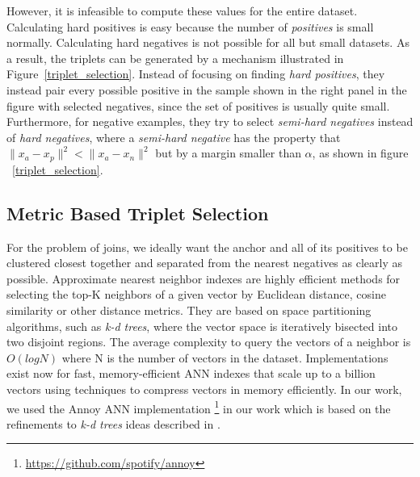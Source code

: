 However, it is infeasible to compute these values for the entire dataset.  Calculating hard positives is easy because the number of \textit{positives} is small normally.  Calculating hard negatives is not possible for all but small datasets.  As a result, the triplets can be generated by a mechanism illustrated in Figure~\ref{triplet_selection}.  Instead of focusing on finding \textit{hard positives}, they instead pair every possible positive in the sample shown in the right panel in the figure with selected negatives, since the set of positives is usually quite small.  Furthermore, for negative examples, they try to select \textit{semi-hard negatives} instead of \textit{hard negatives}, where a \textit{semi-hard negative} has the property that $\|x_a - x_p \|^2 < \|x_a - x_n \|^2$ but by a margin smaller than $\alpha$, as shown in figure ~\ref{triplet_selection}.  


\subsection{Metric Based Triplet Selection}
For the problem of joins, we ideally want the anchor and all of its positives to be clustered closest together and separated from the nearest negatives as clearly as possible.  Approximate nearest neighbor indexes are highly efficient methods for selecting the top-K neighbors of a given vector by Euclidean distance, cosine similarity or other distance metrics.  They are based on space partitioning algorithms, such as \textit{k-d trees}, where the vector space is iteratively bisected into two disjoint regions.  The average complexity to query the vectors of a neighbor is $O(log N)$ where N is the number of vectors in the dataset.  Implementations exist now for fast, memory-efficient ANN indexes that scale up to a billion vectors \cite{JDH17} using techniques to compress vectors in memory efficiently.  In our work, we used the Annoy ANN implementation \footnote{\url{https://github.com/spotify/annoy}} in our work which is based on the refinements to \textit{k-d trees} ideas described in \cite{ann_paper}.

